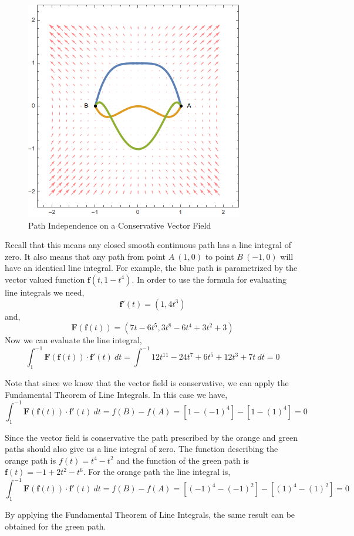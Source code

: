 \documentclass[12pt]{article}
\begin{document}
\begin{figure}[h]
\centering
\caption{Path Independence on a Conservative Vector Field}
\label{fig:lineintegralexample3}
\indent\includegraphics[scale=0.6]{line_integral_example3.png}
\end{figure}

Recall that this means any closed smooth continuous path has a line integral of zero. It also means that any path from point $A\ (1,0)$ to point $B\ (-1,0)$ will have an identical line integral. For example, the blue path is parametrized by the vector valued function $\mathbf{f}(t,1-t^4)$. In order to use the formula for evaluating line integrals we need,
\[
\mathbf{f}'(t) = (1,4t^3)
\]
and,
\[
\mathbf{F}(\mathbf{f}(t)) = (7t-6t^5, 3t^8-6t^4+3t^2+3)
\]
Now we can evaluate the line integral,
\[
\int^{-1}_{1}\mathbf{F}(\mathbf{f}(t))\cdot\mathbf{f}'(t) \ dt = \int^{-1}{1} 2t^{11}-24t^7+6t^5+12t^3+7t \ dt = 0
\]

Note that since we know that the vector field is conservative, we can apply the Fundamental Theorem of Line Integrals. In this case we have,
\[
\int^{-1}_{1}\mathbf{F}(\mathbf{f}(t))\cdot\mathbf{f}'(t) \ dt = f(B)-f(A) = \left[1-(-1)^4\right]-\left[1-(1)^4\right] = 0
\]

Since the vector field is conservative the path prescribed by the orange and green paths should also give us a line integral of zero. The function describing the orange path is $f(t)=t^4-t^2$ and the function of the green path is $\mathbf{f}(t) = -1+2t^2-t^6$. For the orange path the line integral is,
\[
\int^{-1}_{1}\mathbf{F}(\mathbf{f}(t))\cdot\mathbf{f}'(t) \ dt = f(B)-f(A) = \left[(-1)^4-(-1)^2\right]-\left[(1)^4-(1)^2\right] = 0
\]

By applying the Fundamental Theorem of Line Integrals, the same result can be obtained for the green path.




\end{document}
